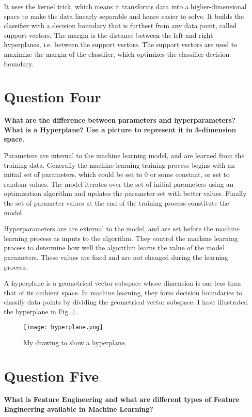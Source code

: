 \documentclass{article}
\begin{document}
 It uses the kernel trick, which means it transforms data into a higher-dimensional space to make the data linearly separable and hence easier to solve. It builds the classifier with a decision boundary that is furthest from any data point, called support vectors. The margin is the distance between the left and right hyperplanes, i.e. between the support vectors. The support vectors are used to maximize the margin of the classifier, which optimizes the classifier decision boundary.

\section{Question Four}
\noindent \textbf{What are the difference between parameters and hyperparameters? What is a Hyperplane? Use a picture to represent it in 3-dimension space.}

Parameters are internal to the machine learning model, and are learned from the training data. Generally the machine learning training process begins with an initial set of parameters, which could be set to 0 or some constant, or set to random values. The model iterates over the set of initial parameters using an optimization algorithm and updates the parameter set with better values. Finally the set of parameter values at the end of the training process constitute the model.

Hyperparameters are are external to the model, and are set before the machine learning process as inputs to the algorithm. They control the machine learning process to determine how well the algorithm learns the value of the model parameters. These values are fixed and are not changed during the learning process.

A hyperplane is a geometrical vector subspace whose dimension is one less than that of its ambient space. In machine learning, they form decision boundaries to classify data points by dividing the geometrical vector subspace. I have illustrated the hyperplane in Fig. \ref{hyperplane}.

\begin{figure}
    \centering
    \texttt{[image: hyperplane.png]}
    \caption{My drawing to show a hyperplane.}
    \label{hyperplane}
\end{figure}

\section{Question Five}
\noindent \textbf{What is Feature Engineering and what are different types of Feature Engineering available in Machine Learning?}
\end{document}
